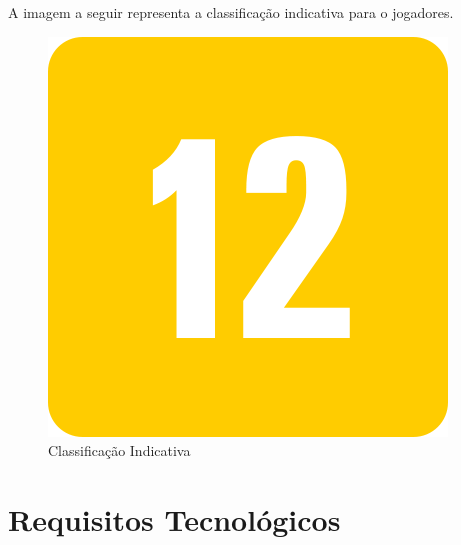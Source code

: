 \documentclass[11pt]{article} %
\begin{document}
A imagem a seguir representa a classificação indicativa para o jogadores.

\newpage

\begin{figure}[!htp]
\centering
\includegraphics[scale=0.5]{res/classification.png}
\caption{Classificação Indicativa}
\label{Classificação Indicativa}
\end{figure}

\section{Requisitos Tecnológicos}
\end{document}
